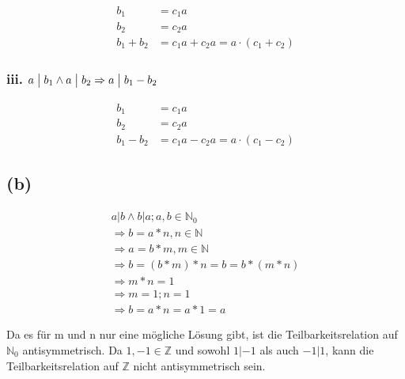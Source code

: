 \documentclass[11pt,a4paper]{article}
\begin{document}
\begin{align*}
b_1 &= c_1a\\
b_2 &= c_2a\\
b_1 + b_2 &= c_1a + c_2a = a \cdot (c_1 + c_2) \tag*{\checkmark}
\end{align*}

\subsubsection*{iii. $a \bigm| b_1 \wedge a \bigm| b_2 \Rightarrow a \bigm| b_1 - b_2$}

\begin{align*}
b_1 &= c_1a\\
b_2 &= c_2a\\
b_1 - b_2 &= c_1a - c_2a = a \cdot (c_1 - c_2) \tag*{\checkmark}
\end{align*}

\subsection*{(b)}
\begin{align*}
a|b \land b|a; a,b\in\mathbb{N}_0\\
\Rightarrow b=a*n, n\in\mathbb{N}\\
\Rightarrow a=b*m, m\in\mathbb{N}\\
\Rightarrow b=(b*m)*n
=b=b*(m*n)\\
\Rightarrow m*n=1\\
\Rightarrow m=1;n=1\\
\Rightarrow b=a*n=a*1=a
\end{align*}
\begin{flushleft}
    Da es für m und n nur eine mögliche Lösung gibt, ist die Teilbarkeitsrelation auf $\mathbb{N}_0$ antisymmetrisch. Da $1,-1 \in \mathbb{Z}$ und sowohl $1|-1$ als auch $-1|1$, kann die Teilbarkeitsrelation auf $\mathbb{Z}$ nicht antisymmetrisch sein.
\end{flushleft}
\end{document}
